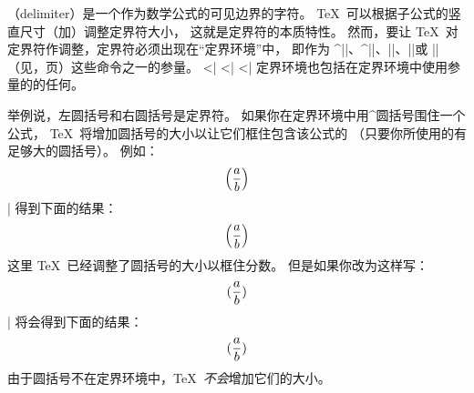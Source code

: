 {%
（delimiter）是一个作为数学公式的可见边界的字符。
\TeX\ 可以根据子公式的竖直尺寸（加）调整定界符大小，
这就是定界符的本质特性。
然而，要让 \TeX\ 对定界符作调整，定界符必须出现在“定界环境”中，
即作为 ^|\left|、^|\right|、|\overwithdelims|、|\atopwithdelims|或 |\abovewithdelims|%
（见\xrefn{\overwithdelims}，\xrefn{\left}页）这些命令之一的参量。
^^|\overwithdelims|
^^|\atopwithdelims|
^^|\abovewithdelims|
定界环境也包括在定界环境中使用参量的的任何。

举例说，左圆括号和右圆括号是定界符。
如果你在定界环境中用^{圆括号}围住一个公式，
\TeX\ 将增加圆括号的大小以让它们框住包含该公式的%
（只要你所使用的有足够大的圆括号）。
例如：
\csdisplay
$$ \left( a \over b \right) $$
|
得到下面的结果：
\centereddisplays $$\left (a \over b \right ) $$
这里 \TeX\ 已经调整了圆括号的大小以框住分数。
但是如果你改为这样写：
\csdisplay
$$({a \over b})$$
|
将会得到下面的结果：
$$({a \over b})$$
由于圆括号不在定界环境中，\TeX\ \emph{不会}增加它们的大小。

}
